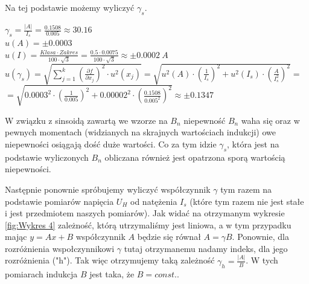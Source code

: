 \documentclass{article}
\begin{document}
\newpage


Na tej podstawie możemy wyliczyć $\gamma_{s}$.
\begin{center}
    \vspace{2.5ex}
    $\gamma_{s}=\frac{|A|}{I_{s}}=\frac{0.1508}{0.005}\approx30.16$\\
    \vspace{2.5ex}
    $u(A)=\pm0.0003$\\
    \vspace{2.5ex}
    $u(I)=\frac{Klasa\cdot Zakres}{100\cdot \sqrt{3}}=\frac{0.5\cdot0.0075}{100\cdot \sqrt{3}}\approx\pm0.0002 \ A$\\
    \vspace{2.5ex}
    $u(\gamma_{s})=\sqrt{\sum^{k}_{j=1}\left(\frac{\partial f}{\partial x_{j}}\right)^{2}\cdot u^{2}(x_{j})}=\sqrt{u^{2}(A)\cdot\left(\frac{1}{I_{s}}\right)^{2}+u^{2}(I_{s})\cdot(\frac{A}{I_{s}^{2}})^{2}}=$\\
    \vspace{2.5ex}
    $=\sqrt{0.0003^{2}\cdot\left(\frac{1}{0.005}\right)^{2}+0.00002^{2}\cdot(\frac{0.1508}{0.005^{2}})^{2}}  \approx\pm0.1347$\\
    \vspace{2.5ex}
\end{center}
W związku z sinsoidą zawartą we wzorze na $B_{n}$ niepewność $B_{n}$ waha się oraz w pewnych momentach (widzianych na skrajnych wartościach indukcji) owe niepewności osiągają dość duże wartości. Co za tym idzie $\gamma_{s}$, która jest na podstawie wyliczonych $B_{n}$ obliczana również jest opatrzona sporą wartością niepewności.\\

\newpage

\par Następnie ponownie spróbujemy wyliczyć współczynnik $\gamma$ tym razem na podstawie pomiarów napięcia $U_{H}$ od natężenia $I_{s}$ (które tym razem nie jest stałe i jest przedmiotem naszych pomiarów). Jak widać na otrzymanym wykresie \ref{fig:Wykres 4} zależność, którą utrzymaliśmy jest liniowa, a w tym przypadku mając $y=Ax+B$ współczynnik $A$ będzie się równał $A=\gamma B$. Ponownie, dla rozróżnienia wspołczynnikowi $\gamma$ tutaj otrzymanemu nadamy indeks, dla jego rozróżnienia ("h"). Tak więc otrzymujemy taką zależność $\gamma_{h}=\frac{|A|}{B}$. W tych pomiarach indukcja $B$ jest taka, że $B=const.$.
\end{document}
